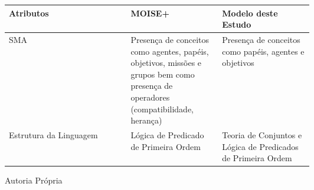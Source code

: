 \begin{center}
\begin{longtable}[H]{|l|p{0.3\linewidth}|p{0.3\linewidth}|}
\\ \hline

\newpage

\hline
\textbf{Atributos}
& 
\textbf{MOISE+}  
& 
\textbf{Modelo deste Estudo} 

\\ \hline

SMA        		
& 
Presença de conceitos como agentes, papéis, objetivos, missões e grupos bem como presença de  operadores (compatibilidade, herança)  
& 
Presença de conceitos como papéis, agentes e objetivos

\\ \hline
Estrutura da Linguagem
& 
Lógica de Predicado de Primeira Ordem 
&
Teoria de Conjuntos e Lógica de Predicados de Primeira Ordem

\\ \hline
\end{longtable}
Autoria Própria
\end{center}